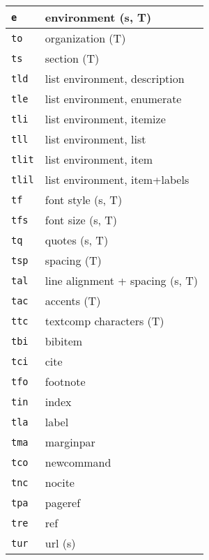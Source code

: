\documentclass[oneside,10pt,landscape,DIV16]{scrartcl}
\newcommand{\Map}[1] {\textbf{\textasciiacute}\texttt{#1}}
\begin{document}
\begin{multicols}{3}
\begin{center}
\begin{tabular}[]{|p{11mm}|p{60mm}|}
\hline \Map{e}    & environment                    \hfill (s, T)\\
\hline \Map{to}   & organization                   \hfill (T)\\
\hline \Map{ts}   & section                        \hfill (T)\\
\hline \Map{tld}  & list environment, description  \\
\hline \Map{tle}  & list environment, enumerate    \\
\hline \Map{tli}  & list environment, itemize      \\
\hline \Map{tll}  & list environment, list         \\
\hline \Map{tlit} & list environment, item         \\
\hline \Map{tlil} & list environment, item+labels  \\
\hline \Map{tf}   & font style                     \hfill (s, T)\\
\hline \Map{tfs}  & font size                      \hfill (s, T)\\
\hline \Map{tq}   & quotes                         \hfill (s, T)\\
\hline \Map{tsp}  & spacing                        \hfill (T)\\
\hline \Map{tal}  & line alignment + spacing       \hfill (s, T)\\
\hline \Map{tac}  & accents                        \hfill (T)\\
\hline \Map{ttc}  & textcomp characters            \hfill (T)\\
\hline
\hline \Map{tbi}  & bibitem                        \\
\hline \Map{tci}  & cite                           \\
\hline \Map{tfo}  & footnote                       \\
\hline \Map{tin}  & index                          \\
\hline \Map{tla}  & label                          \\
\hline \Map{tma}  & marginpar                      \\
\hline \Map{tco}  & newcommand                     \\
\hline \Map{tnc}  & nocite                         \\
\hline \Map{tpa}  & pageref                        \\
\hline \Map{tre}  & ref                            \\
\hline \Map{tur}  & url                            \hfill (s)\\

\end{tabular}
\end{center}
\end{multicols}
\end{document}
